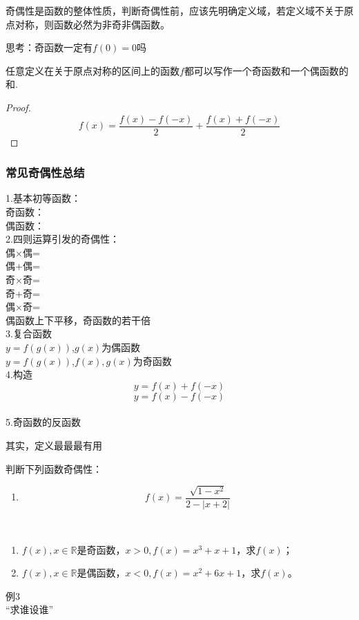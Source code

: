 奇偶性是函数的整体性质，判断奇偶性前，应该先明确定义域，若定义域不关于原点对称，则函数必然为非奇非偶函数。

思考：奇函数一定有$f(0)=0$吗

\begin{theorem}
    任意定义在关于原点对称的区间上的函数$f$都可以写作一个奇函数和一个偶函数的和.
\end{theorem}
\begin{proof}
    \[f(x)=\frac{f(x)-f(-x)}{2}+\frac{f(x)+f(-x)}{2}\]
\end{proof}
\subsubsection*{常见奇偶性总结}
1.基本初等函数：
\\奇函数：
\\偶函数：
\\2.四则运算引发的奇偶性：
\\偶$\times$偶=
\\偶+偶=
\\奇$\times$奇=
\\奇+奇=
\\偶$\times$奇=
\\偶函数上下平移，奇函数的若干倍
\\3.复合函数
\\$y=f(g(x))$,$g(x)$为偶函数
\\$y=f(g(x))$,$f(x),g(x)$为奇函数
\\4.构造
\[y=f(x)+f(-x)\]
\[y=f(x)-f(-x)\]
\\5.奇函数的反函数

其实，定义最最最有用
\begin{exercise}判断下列函数奇偶性：
    \begin{enumerate}
        \item \[f(x)=\frac{\sqrt{1-x^2}}{2-|x+2|}\]
    \end{enumerate}
    
\end{exercise}
\begin{example}
    \ 
    
    \begin{enumerate}
        \item $f(x),x\in \mathbb{R}$是奇函数，$x>0,f(x)=x^3+x+1$，求$f(x)$；
        \item $f(x),x\in \mathbb{R}$是偶函数，$x<0,f(x)=x^2+6x+1$，求$f(x)$。
    \end{enumerate}
\end{example}
例3 
\\“求谁设谁”


